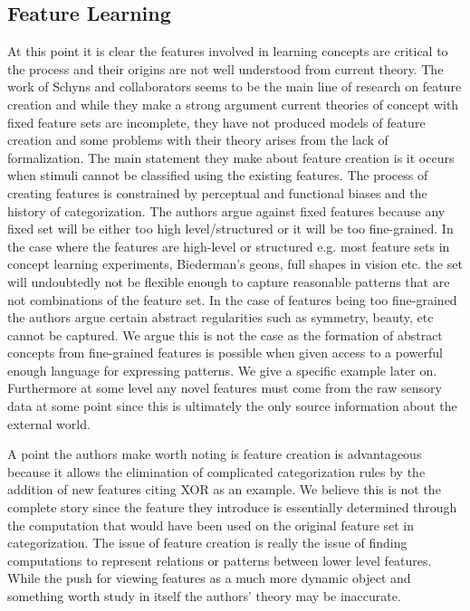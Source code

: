 \documentclass[doc]{apa}%
\begin{document}
\subsection{Feature Learning}
    At this point it is clear the features involved in learning
    concepts are critical to the process and their origins are not
    well understood from current theory.  The work of Schyns and
    collaborators \cite{schyns98} seems to be the main line of
    research on feature creation and while they make a strong argument
    current theories of concept with fixed feature sets are
    incomplete, they have not produced models of feature creation and
    some problems with their theory arises from the lack of
    formalization.  The main statement they make about feature
    creation is it occurs when stimuli cannot be classified using the
    existing features.  The process of creating features is
    constrained by perceptual and functional biases and the history of
    categorization.  The authors argue against fixed features because
    any fixed set will be either too high level/structured or it will
    be too fine-grained.  In the case where the features are
    high-level or structured e.g. most feature sets in concept
    learning experiments, Biederman's geons, full shapes in vision
    etc. the set will undoubtedly not be flexible enough to capture
    reasonable patterns that are not combinations of the feature set.
    In the case of features being too fine-grained the authors argue
    certain abstract regularities such as symmetry, beauty, etc cannot
    be captured.  We argue this is not the case as the formation of abstract
    concepts from fine-grained features is possible when given access
    to a powerful enough language for expressing patterns.  We give a
    specific example later on.  Furthermore at some level any novel features must come from the raw sensory data at some point since this is ultimately the only source information about the external world.

A point the authors make worth noting is feature creation is
advantageous because it allows the elimination of complicated
categorization rules by the addition of new features citing XOR as an
example.  We believe this is not the complete story since the feature
they introduce is essentially determined through the computation that
would have been used on the original feature set in categorization.
The issue of feature creation is really the issue of finding
computations to represent relations or patterns between lower level features.
While the push for viewing features as a much more dynamic object and
something worth study in itself the authors' theory may be
inaccurate. 
\end{document}
